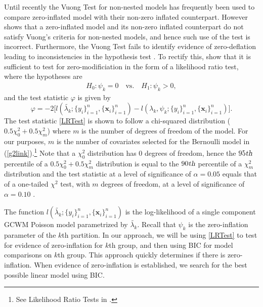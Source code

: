\documentclass[12pt,letterpaper]{article}
\numberwithin{equation}{section}
\numberwithin{equation}{section}
\numberwithin{equation}{section}
\begin{document}
Until recently the Vuong Test for non-nested models  \citep{vuongTest} has frequently been used to compare zero-inflated model with their non-zero inflated counterpart. However \cite{misuse} shows that a zero-inflated model and its non-zero inflated counterpart do not satisfy Vuong's criteria for non-nested models, and hence such use of the test is incorrect. Furthermore, the Vuong Test fails to identify evidence of zero-deflation leading to inconsistencies in the hypothesis test \citep[see][]{misuse}. To rectify this, \cite{newIntuitive} show that it is sufficient to test for zero-modificiation in the form of a likelihood ratio test, where the hypotheses are
\begin{align*}
& & H_0: \psi_k = 0 \quad \text{vs.} \quad H_1: \psi_k > 0, & &
\end{align*}
and the test statistic $\varphi$ is given by
\begin{equation}
\varphi = -2 \big[l(\tilde{\lambda_k}; \{y_i\}_{i=1}^n,\{\bm{x}_i\}_{i=1}^n) - l(\lambda_k, \psi_k; \{y_i\}_{i=1}^n,\{\bm{x}_i\}_{i=1}^n )\big].
\label{LRTest}
\end{equation}
The test statistic \eqref{LRTest} is shown to follow a chi-squared distribution ($0.5\chi^2_0+0.5\chi^2_{m}$) where $m$ is the  number of degrees of freedom of the model. For our purposes, $m$ is the number of covariates selected for the Bernoulli model in (\ref{g2link}).\footnote{See Likelihood Ratio Tests in  \cite{newIntuitive}.} Note that  a $\chi^2_0$ distribution has 0 degrees of freedom, hence the $95{\mbox{\sl{th}}}$ percentile of a  $0.5\chi^2_0+0.5\chi^2_{m}$ distribution is equal to the $90{\mbox{\sl{th}}}$ percentile of a $\chi^2_{m}$ distribution and the test statistic at a level of significance of $\alpha=0.05$ equals that of a one-tailed $\chi^2$ test, with $m$ degrees of freedom, at a level of significance of $\alpha=0.10$ \citep[see][]{newIntuitive}. 

The function 
$l(\tilde{\lambda_k}; \{y_i\}_{i=1}^n,\{\bm{x}_i\}_{i=1}^n)$ is the log-likelihood of a single component GCWM Poisson model parametrized by $\tilde{\lambda_k}$. Recall that $\psi_k$ is the zero-inflation parameter of the $k$th partition.  In our approach, we will be using \eqref{LRTest} to test for evidence of zero-inflation for $k$th group, and then using BIC for model comparisons on $k$th group. This approach quickly determines if there is zero-inflation.  When evidence of zero-inflation is established, we search for the best possible linear model using BIC. 
\end{document}
